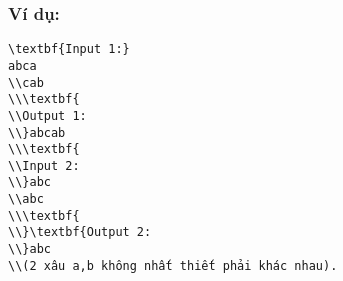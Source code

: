 \subsubsection{\textbf{    Ví dụ:   }}
\begin{verbatim}
\textbf{Input 1:}
abca
\\cab
\\\textbf{
\\Output 1:
\\}abcab
\\\textbf{
\\Input 2:
\\}abc
\\abc
\\\textbf{
\\}\textbf{Output 2:
\\}abc
\\(2 xâu a,b không nhất thiết phải khác nhau).\end{verbatim}